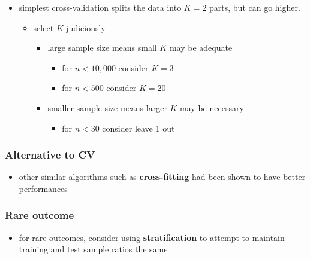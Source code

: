 \documentclass[
]{book}
\providecommand{\tightlist}{%
  \setlength{\itemsep}{0pt}\setlength{\parskip}{0pt}}
\begin{document}
\begin{itemize}
\tightlist
\item
  simplest cross-validation splits the data into \(K=2\) parts, but can go higher.

  \begin{itemize}
  \tightlist
  \item
    select \(K\) judiciously

    \begin{itemize}
    \tightlist
    \item
      large sample size means small \(K\) may be adequate

      \begin{itemize}
      \tightlist
      \item
        for \(n \lt 10,000\) consider \(K=3\)
      \item
        for \(n \lt 500\) consider \(K=20\)
      \end{itemize}
    \item
      smaller sample size means larger \(K\) may be necessary

      \begin{itemize}
      \tightlist
      \item
        for \(n \lt 30\) consider leave 1 out
      \end{itemize}
    \end{itemize}
  \end{itemize}
\end{itemize}

\hypertarget{alternative-to-cv}{%
\subsubsection{Alternative to CV}\label{alternative-to-cv}}

\begin{itemize}
\tightlist
\item
  other similar algorithms such as \textbf{cross-fitting} had been shown to have better performances
\end{itemize}

\hypertarget{rare-outcome}{%
\subsubsection{Rare outcome}\label{rare-outcome}}

\begin{itemize}
\tightlist
\item
  for rare outcomes, consider using \textbf{stratification} to attempt to maintain training and test sample ratios the same
\end{itemize}
\end{document}
